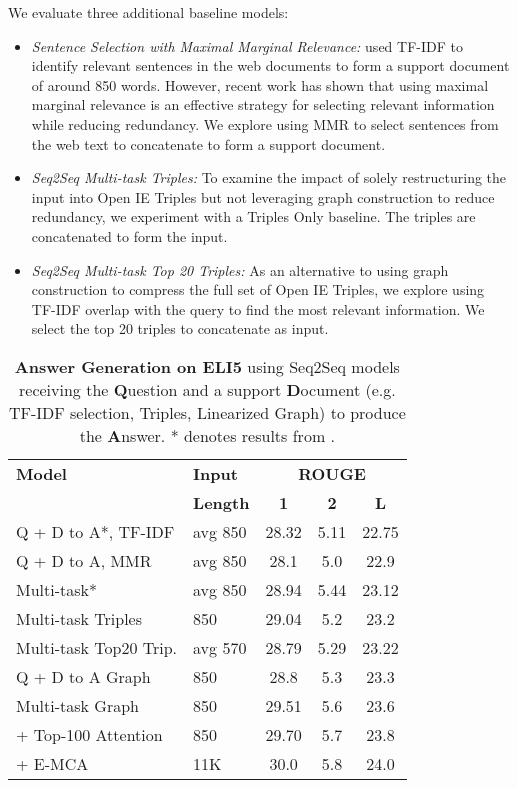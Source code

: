 \documentclass[11pt,a4paper]{article}
\newcommand*{\round}[1]{\num[round-mode=places,round-precision=1]{#1}}
\begin{document}
We evaluate three additional baseline models: 
\begin{itemize}
    \setlength\itemsep{-0.2em}
    \item \textit{Sentence Selection with Maximal Marginal Relevance:} \cite{fan2019explain} used TF-IDF to identify relevant sentences in the web documents to form a support document of around 850 words. However, recent work \cite{fabbri2019multi} has shown that using maximal marginal relevance is an effective strategy for selecting relevant information while reducing redundancy. We explore using MMR to select sentences from the web text to concatenate to form a support document.
    \item \textit{Seq2Seq Multi-task Triples:} To examine the impact of solely restructuring the input into Open IE Triples but not leveraging graph construction to reduce redundancy, we experiment with a Triples Only baseline. The triples are concatenated to form the input.
    \item \textit{Seq2Seq Multi-task Top 20 Triples:} As an alternative to using graph construction to compress the full set of Open IE Triples, we explore using TF-IDF overlap with the query to find the most relevant information. We select the top 20 triples to concatenate as input. 
\end{itemize}

\begin{table}[t!]
  \centering \small
  \begin{tabular}{ l l c  c  c}\toprule
    \bf{Model} & \bf{Input} & \multicolumn{3}{c}{\bf{ROUGE}} \\
               & \textbf{Length} & \bf{1} & \bf{2} & \bf{L} \\\hline\hline
        Q + D to A*, TF-IDF & avg 850 & \round{28.32} & \round{5.11} & \round{22.75} \\
        Q + D to A, MMR & avg 850 & \round{28.1} & \round{5.0} & \round{22.9} \\
        Multi-task* & avg 850 & \round{28.94} & \round{5.44} & \round{23.12} \\ 
        \hline         
        Multi-task Triples  & 850 & \round{29.04} & \round{5.2}  & \round{23.2} \\ 
        Multi-task Top20 Trip. & avg 570 & \round{28.79} & \round{5.29} & \round{23.22} \\ 
        \hline 
        Q + D to A Graph    & 850 & \round{28.8} & 5.3 & 23.3 \\ 
        Multi-task Graph    & 850 & \round{29.51} & \round{5.6} & \round{23.6} \\ 
        + Top-100 Attention  & 850 & \round{29.70} & \round{5.7} & \round{23.8}\\ 
        + E-MCA & 11K & \round{30.0} & \round{5.8} & \round{24.0} \\ 
        \bottomrule
\end{tabular}
   \caption{\textbf{Answer Generation on ELI5} using Seq2Seq models receiving the \textbf{Q}uestion and a support \textbf{D}ocument (e.g. TF-IDF selection, Triples, Linearized Graph) to produce the \textbf{A}nswer. * denotes results from \cite{fan2019explain}.}
 \label{tbl:full_rouge_answer}
\end{table}
\end{document}
